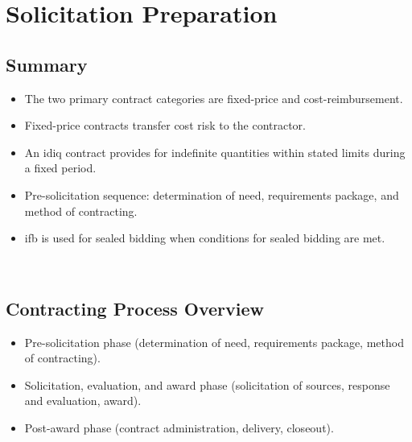 \documentclass[../main.tex]{subfiles}
\begin{document}

\section{Solicitation Preparation}

\subsection{Summary}
\begin{itemize}
  \item The two primary contract categories are fixed-price and cost-reimbursement.
  \item Fixed-price contracts transfer cost risk to the contractor.
  \item An \ac{idiq} contract provides for indefinite quantities within stated limits during a fixed period.
  \item Pre-solicitation sequence: determination of need, requirements package, and method of contracting.
  \item \ac{ifb} is used for sealed bidding when conditions for sealed bidding are met.
\end{itemize}
~

\subsection{Contracting Process Overview}
\begin{itemize}
  \item Pre-solicitation phase (determination of need, requirements package, method of contracting).
  \item Solicitation, evaluation, and award phase (solicitation of sources, response and evaluation, award).
  \item Post-award phase (contract administration, delivery, closeout).
\end{itemize}
~\autocite{edo-3-2-2-solicitation-prep-2025}
\end{document}
